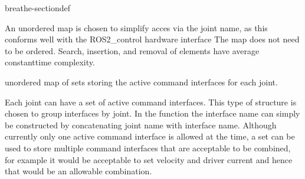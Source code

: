\documentclass[letterpaper,10pt,english]{sphinxmanual}
\begin{document}
\begin{fulllineitems}
\begin{sphinxuseclass}{breathe-sectiondef}
\begin{fulllineitems}
\sphinxAtStartPar
An unordered map is chosen to simplify acces via the joint name, as this conforms well with the ROS2\_control hardware interface The map does not need to be ordered. Search, insertion, and removal of elements have average constant\sphinxhyphen{}time complexity. 

\end{fulllineitems}


\begin{fulllineitems}
\label{\detokenize{code/bioscara_hardware_interfaces/index:_CPPv4N28bioscara_hardware_interfaces28bioscara_hardware_interfaces28BioscaraArmHardwareInterface20_joint_command_modesE}}\label{\detokenize{code/bioscara_hardware_interfaces/index:_CPPv3N28bioscara_hardware_interfaces28bioscara_hardware_interfaces28BioscaraArmHardwareInterface20_joint_command_modesE}}\label{\detokenize{code/bioscara_hardware_interfaces/index:_CPPv2N28bioscara_hardware_interfaces28bioscara_hardware_interfaces28BioscaraArmHardwareInterface20_joint_command_modesE}}\label{\detokenize{code/bioscara_hardware_interfaces/index:bioscara_hardware_interfaces::bioscara_hardware_interfaces::BioscaraArmHardwareInterface::_joint_command_modes__std::unordered_map:ss.std::set:ss::}}
\pysigstartsignatures
\pysigstartmultiline
\pysigline
{\label{\detokenize{code/bioscara_hardware_interfaces/index:classbioscara__hardware__interfaces_1_1BioscaraArmHardwareInterface_1afc419a32f050cf461e64d958fed917ce}}}
\pysigstopmultiline
\pysigstopsignatures
\sphinxAtStartPar
unordered map of sets storing the active command interfaces for each joint. 

\sphinxAtStartPar
Each joint can have a set of active command interfaces. This type of structure is chosen to group interfaces by joint. In the {\hyperref[\detokenize{code/bioscara_hardware_interfaces/index:classbioscara__hardware__interfaces_1_1BioscaraArmHardwareInterface_1a4ffd7d4e6890f9dfc3d757fb5e3bd5e3}]{}} function the interface name can simply be constructed by concatenating joint name with interface name. Although currently only one active command interface is allowed at the time, a set can be used to store multiple command interfaces that are acceptable to be combined, for example it would be acceptable to set velocity and driver current and hence that would be an allowable combination.


\end{fulllineitems}
\end{sphinxuseclass}
\end{fulllineitems}
\end{document}

